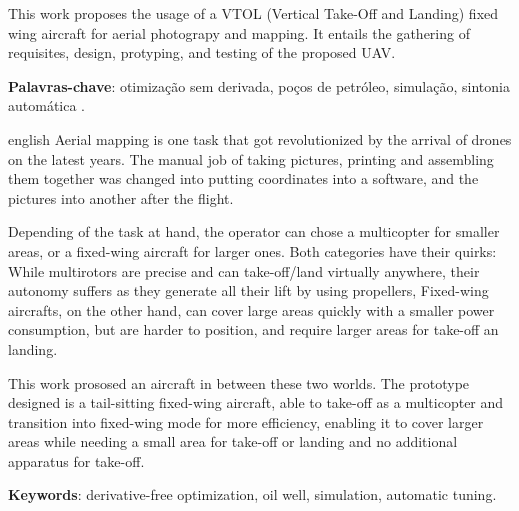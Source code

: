 
\setlength{\absparsep}{18pt} %
\begin{resumo}

This work proposes the usage of a VTOL (Vertical Take-Off and Landing) fixed wing aircraft for aerial photograpy and mapping. It entails the gathering of requisites, design, protyping, and testing of the proposed UAV.


 \textbf{Palavras-chave}: otimização sem derivada, poços de petróleo, simulação, sintonia automática .
\end{resumo}

\begin{resumo}[Abstract]
 \begin{otherlanguage*}{english}
Aerial mapping is one task that got revolutionized by the arrival of drones on the latest years. The manual job of taking pictures, printing and assembling them together was changed into putting coordinates into a software, and the pictures into another after the flight.

Depending of the task at hand, the operator can chose a multicopter for smaller areas, or a fixed-wing aircraft for larger ones. Both categories have their quirks: While multirotors are precise and can take-off/land virtually anywhere, their autonomy suffers as they generate all their lift by using propellers, Fixed-wing aircrafts, on the other hand, can cover large areas quickly with a smaller power consumption, but are harder to position, and require larger areas for take-off an landing.
 
This work prososed an aircraft in between these two worlds. The prototype designed is a tail-sitting fixed-wing aircraft, able to take-off as a multicopter and transition into fixed-wing mode for more efficiency, enabling it to cover larger areas while needing a small area for take-off or landing and no additional apparatus for take-off.


   \vspace{\onelineskip}
 
   \noindent 
   \textbf{Keywords}: derivative-free optimization, oil well, simulation, automatic tuning.
 \end{otherlanguage*}
\end{resumo}
